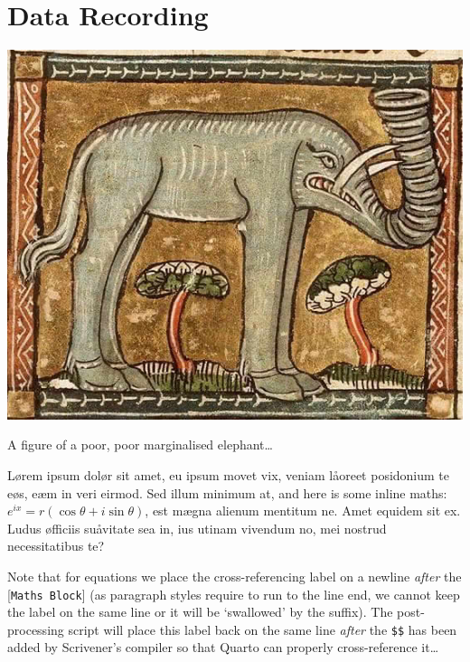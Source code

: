 \documentclass[
  12pt,
  a4paper,
  oneside,
  titlepage,
  toclink=all,
  toc=bibliography]{scrbook}
\theoremstyle{definition}
\theoremstyle{plain}
\theoremstyle{plain}
\theoremstyle{plain}
\theoremstyle{plain}
\theoremstyle{definition}
\theoremstyle{definition}
\theoremstyle{plain}
\theoremstyle{remark}
\begin{document}
\protect\hypertarget{scriv150}{}{}

\hypertarget{sec-scriv151}{%
\section{Data Recording}\label{sec-scriv151}}

\protect\hypertarget{scriv151}{}{}

\begin{marginfigure}

{\centering \includegraphics{Elephant3.jpg}

}

\caption{\label{fig-scriv151}A figure of a poor, poor marginalised
elephant\ldots{}}

\end{marginfigure}

Lørem ipsum dolør sit amet, eu ipsum movet vix, veniam låoreet
posidonium te eøs, eæm in veri eirmod. Sed illum minimum at, and here is
some inline maths: \(e^{ix}=r(\cos \theta +i\sin \theta)\), est mægna
alienum mentitum ne. Amet equidem sit ex. Ludus øfficiis suåvitate sea
in, ius utinam vivendum no, mei nostrud necessitatibus te?

Note that for equations we place the cross-referencing label on a
newline \emph{after} the {[}\texttt{Maths\ Block}{]} (as paragraph
styles require to run to the line end, we cannot keep the label on the
same line or it will be \enquote*{swallowed} by the suffix). The
post-processing script will place this label back on the same line
\emph{after} the \texttt{\$\$} has been added by Scrivener's compiler so
that Quarto can properly cross-reference it\ldots{}
\end{document}
